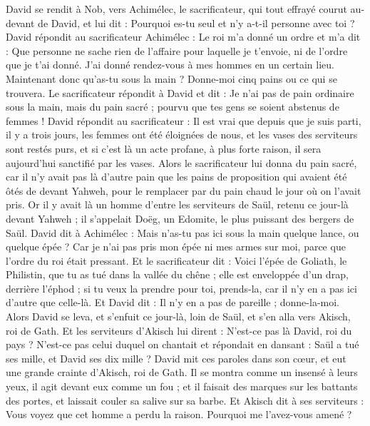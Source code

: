 \begin{multicols}{2}
\VerseOne{}David se rendit à Nob, vers Achimélec, le sacrificateur, qui tout effrayé courut au-devant de David, et lui dit : Pourquoi es-tu seul et n'y a-t-il personne avec toi ?
David répondit au sacrificateur Achimélec : Le roi m'a donné un ordre et m'a dit : Que personne ne sache rien de l'affaire pour laquelle je t'envoie, ni de l'ordre que je t'ai donné. J'ai donné rendez-vous à mes hommes en un certain lieu.
Maintenant donc qu'as-tu sous la main ? Donne-moi cinq pains ou ce qui se trouvera.
Le sacrificateur répondit à David et dit : Je n'ai pas de pain ordinaire sous la main, mais du pain sacré ; pourvu que tes gens se soient abstenus de femmes !
David répondit au sacrificateur : Il est vrai que depuis que je suis parti, il y a trois jours, les femmes ont été éloignées de nous, et les vases des serviteurs sont restés purs, et si c'est là un acte profane, à plus forte raison, il sera aujourd'hui sanctifié par les vases.
Alors le sacrificateur lui donna du pain sacré, car il n'y avait pas là d'autre pain que les pains de proposition qui avaient été ôtés de devant Yahweh, pour le remplacer par du pain chaud le jour où on l'avait pris.
Or il y avait là un homme d'entre les serviteurs de Saül, retenu ce jour-là devant Yahweh ; il s'appelait Doëg, un Edomite, le plus puissant des bergers de Saül.
David dit à Achimélec : Mais n'as-tu pas ici sous la main quelque lance, ou quelque épée ? Car je n'ai pas pris mon épée ni mes armes sur moi, parce que l'ordre du roi était pressant.
Et le sacrificateur dit : Voici l'épée de Goliath, le Philistin, que tu as tué dans la vallée du chêne ; elle est enveloppée d'un drap, derrière l'éphod ; si tu veux la prendre pour toi, prends-la, car il n'y en a pas ici d'autre que celle-là. Et David dit : Il n'y en a pas de pareille ; donne-la-moi.
Alors David se leva, et s'enfuit ce jour-là, loin de Saül, et s'en alla vers Akisch, roi de Gath.
Et les serviteurs d'Akisch lui dirent : N'est-ce pas là David, roi du pays ? N'est-ce pas celui duquel on chantait et répondait en dansant : Saül a tué ses mille, et David ses dix mille ?
David mit ces paroles dans son cœur, et eut une grande crainte d'Akisch, roi de Gath.
Il se montra comme un insensé à leurs yeux, il agit devant eux comme un fou ; et il faisait des marques sur les battants des portes, et laissait couler sa salive sur sa barbe.
Et Akisch dit à ses serviteurs : Vous voyez que cet homme a perdu la raison. Pourquoi me l'avez-vous amené ?

\end{multicols}
